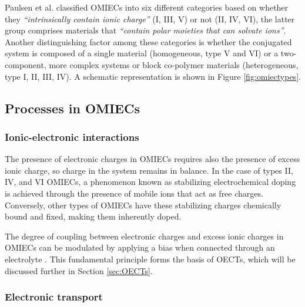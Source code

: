 Paulsen et al. classified OMIECs into six different categories based on whether they \textit{``intrinsically contain ionic charge''} (I, III, V) or not (II, IV, VI), the latter group comprises materials that \textit{``contain polar moieties that can solvate ions''}. Another distinguishing factor among these categories is whether the conjugated system is composed of a single material (homogeneous, type V and VI) or a two-component, more complex systems or block co-polymer materials (heterogeneous, type I, II, III, IV)\cite{paulsenOrganicMixedIonic2020}. A schematic representation is shown in Figure \ref{fig:omiectypes}. %


\subsection{Processes in OMIECs}

\subsubsection{Ionic-electronic interactions}
The presence of electronic charges in OMIECs %
requires also the presence of excess ionic charge, so charge in the system remains in balance. In the case of types II, IV, and VI OMIECs, a phenomenon known as stabilizing electrochemical doping is achieved through the presence of mobile ions that act as free charges. Conversely, other types of OMIECs have these stabilizing charges chemically bound and fixed, making them inherently doped.


The degree of coupling between electronic charges and excess ionic charges in OMIECs can be modulated by applying a bias when connected through an electrolyte \cite{paulsenOrganicMixedIonic2020}. This fundamental principle forms the basis of OECTs, which will be discussed further in Section \ref{sec:OECTs}.

\subsubsection{Electronic transport}


